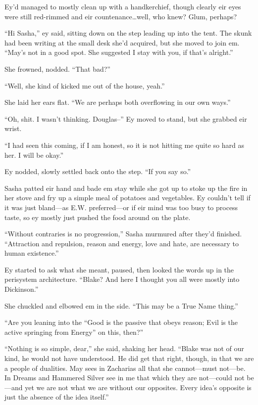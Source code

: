 Ey'd managed to mostly clean up with a handkerchief, though clearly eir eyes were still red-rimmed and eir countenance\ldots well, who knew? Glum, perhaps?

``Hi Sasha,'' ey said, sitting down on the step leading up into the tent. The skunk had been writing at the small desk she'd acquired, but she moved to join em. ``May's not in a good spot. She suggested I stay with you, if that's alright.''

She frowned, nodded. ``That bad?''

``Well, she kind of kicked me out of the house, yeah.''

She laid her ears flat. ``We are perhaps both overflowing in our own ways.''

``Oh, shit. I wasn't thinking. Douglas--'' Ey moved to stand, but she grabbed eir wrist.

``I had seen this coming, if I am honest, so it is not hitting me quite so hard as her. I will be okay.''

Ey nodded, slowly settled back onto the step. ``If you say so.''

Sasha patted eir hand and bade em stay while she got up to stoke up the fire in her stove and fry up a simple meal of potatoes and vegetables. Ey couldn't tell if it was just bland—as E.W. preferred—or if eir mind was too busy to process taste, so ey mostly just pushed the food around on the plate.

``Without contraries is no progression,'' Sasha murmured after they'd finished. ``Attraction and repulsion, reason and energy, love and hate, are necessary to human existence.''

Ey started to ask what she meant, paused, then looked the words up in the perisystem architecture. ``Blake? And here I thought you all were mostly into Dickinson.''

She chuckled and elbowed em in the side. ``This may be a True Name thing.''

``Are you leaning into the ``Good is the passive that obeys reason; Evil is the active springing from Energy'' on this, then?''

``Nothing is so simple, dear,'' she said, shaking her head. ``Blake was not of our kind, he would not have understood. He did get that right, though, in that we are a people of dualities. May sees in Zacharias all that she cannot—must not—be. In Dreams and Hammered Silver see in me that which they are not—could not be—and yet we are not what we are without our opposites. Every idea's opposite is just the absence of the idea itself.''

